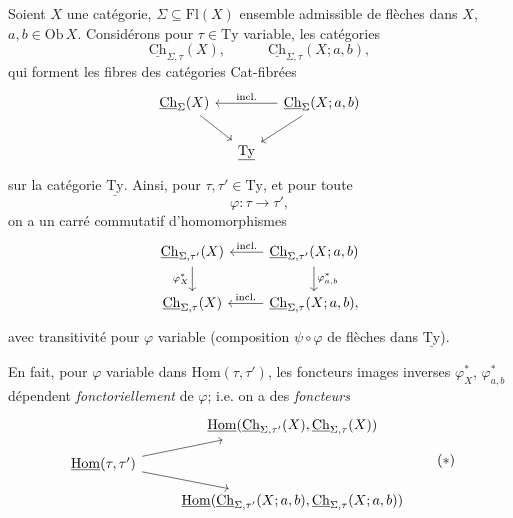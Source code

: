 \documentclass[11pt]{article}
\newcommand{\printedpage}[1]{\marginpar{\footnotesize p.~#1}}
\newcommand{\msp}[1]{\marginpar{\vspace*{10pt}\footnotesize [#1]}}
\newcommand{\uTy}{\underline{\mathrm{Ty}}}
\newcommand{\uHom}{\underline{\mathrm{Hom}}}
\newcommand{\uCh}{\underline{\mathrm{Ch}}}
\begin{document}
Soient $X$ une catégorie, $\Sigma\subseteq\mathrm{Fl}(X)$ ensemble admissible de flèches dans $X$, $a,b\in\mathrm{Ob}\,X$. Considérons pour $\tau\in\mathrm{Ty}$ variable, les catégories
\[
\uCh_{\Sigma,\tau}(X),\qquad\quad\uCh_{\Sigma,\tau}(X;a,b),
\]
qui forment les fibres des catégories Cat-fibrées
\[
\begin{tikzcd}[column sep=small]
\uCh_\Sigma(X) \arrow[dr] & & \uCh_\Sigma(X;a,b) \arrow[ll, "\text{incl.}"'] \arrow[dl]\\
 & \uTy &
\end{tikzcd}
\]
sur la catégorie $\uTy$. Ainsi, pour $\tau,\tau'\in\mathrm{Ty}$, et pour toute
\[
\varphi:\tau\longrightarrow\tau',
\]
on a un carré commutatif d'homomorphismes
\[
\begin{tikzcd}
\uCh_{\Sigma,\tau'}(X) \arrow[d, "\varphi^*_X"'] & \uCh_{\Sigma,\tau'}(X;a,b) \arrow[l, "\text{incl.}"'] \arrow[d, "\varphi^*_{a,b}"]\\
\uCh_{\Sigma,\tau}(X) & \uCh_{\Sigma,\tau}(X;a,b), \arrow[l, "\text{incl.}"']
\end{tikzcd}
\]
avec transitivité pour $\varphi$ variable (composition $\psi\circ\varphi$ de flèches dans $\uTy$).

En fait, pour $\varphi$ variable dans $\uHom(\tau,\tau')$, les foncteurs images inverses $\varphi^*_X$, $\varphi^*_{a,b}$ dépendent \textit{fonctoriellement} de $\varphi$; i.e. on a des \textit{foncteurs}
\[
\begin{tikzcd}[row sep=small]
 & \uHom(\uCh_{\Sigma,\tau'}(X),\uCh_{\Sigma,\tau}(X))\\
\uHom(\tau,\tau') \arrow[ur] \arrow[dr] & \\
 & \uHom(\uCh_{\Sigma,\tau'}(X;a,b),\uCh_{\Sigma,\tau}(X;a,b))
\end{tikzcd}
\tag*{$(*)$}
\]

\newpage
\printedpage{61}

\msp{page 95}
\end{document}
